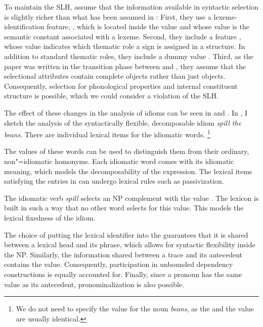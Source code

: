 \documentclass[output=paper
	        ,collection
	        ,collectionchapter
 	        ,biblatex
                ,babelshorthands
                ,newtxmath
                ,draftmode
                ,colorlinks, citecolor=brown
]{langscibook}
\begin{document}
To maintain the SLH, \citet{KE94a} assume that the information available in syntactic selection is slightly richer than what has been assumed in \citet{ps2}:
First, they use a lexeme-identification feature, , which is located inside the  value and whose value is the semantic constant associated with a lexeme. 
Second, they include a feature , whose value indicates which thematic role a sign is assigned in a structure. In addition to standard thematic roles, they include a dummy value .
Third, as the paper was written in the transition phase between \citet{ps} and \citet{ps2}, they assume that the selectional attributes contain complete  objects rather than just  objects. 
Consequently, selection for phonological properties and internal constituent structure is possible, which we could consider a violation of the SLH. 

The effect of these changes in the analysis of idioms can be seen in  and . In , I sketch the analysis of the syntactically flexible, decomposable idiom \emph{spill the beans}.
There are individual lexical items for the idiomatic words.%
\footnote{We do not need to specify the  value for the noun \emph{beans}, as the  and the  value are usually identical.}


\eal %
\label{ke-spill}
\ex 
{}
\ex 
{}
\zl 

The  values of these words can be used to distinguish them from their ordinary, non"=idiomatic homonyms. 
Each idiomatic word comes with its idiomatic meaning, which models the decomposability of the expression. 
The lexical items satisfying the entries in  can undergo lexical rules such as passivization. 

The idiomatic verb \emph{spill} selects an NP complement with the  value . 
The lexicon is built in such a way that no other word selects for this  value. 
This models the lexical fixedness of the idiom.

The choice of putting the lexical identifier into the  guarantees that it is shared between a lexical head and its phrase, which allows for syntactic flexibility inside the NP. 
Similarly, the information shared between a trace and its antecedent contains the  value. Consequently, participation in unbounded dependency constructions is equally accounted for.
Finally, since a pronoun has the same  value as its antecedent, pronominalization is also possible. 
%
\end{document}
